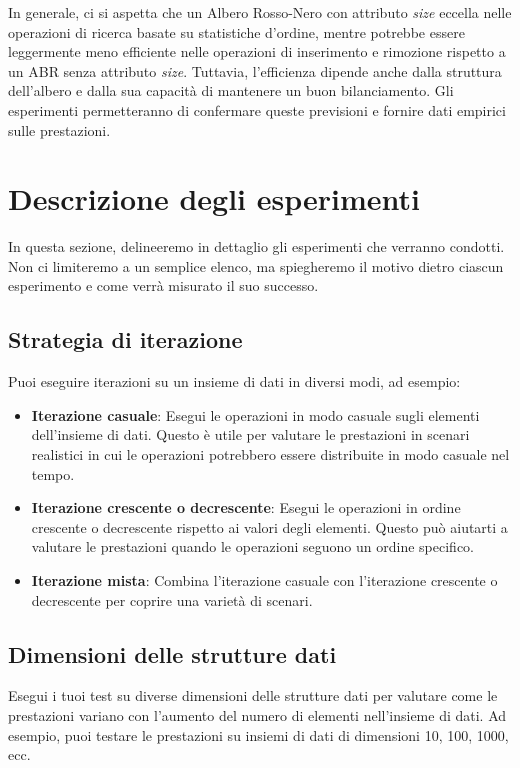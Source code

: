 \documentclass[twocolumn]{article}
\begin{document}
In generale, ci si aspetta che un Albero Rosso-Nero con attributo \textit{size} eccella nelle operazioni di ricerca basate su statistiche d'ordine, mentre potrebbe essere leggermente meno efficiente nelle operazioni di inserimento e rimozione rispetto a un ABR senza attributo \textit{size}. Tuttavia, l'efficienza dipende anche dalla struttura dell'albero e dalla sua capacità di mantenere un buon bilanciamento. Gli esperimenti permetteranno di confermare queste previsioni e fornire dati empirici sulle prestazioni.

\section{Descrizione degli esperimenti}

In questa sezione, delineeremo in dettaglio gli esperimenti che verranno condotti. Non ci limiteremo a un semplice elenco, ma spiegheremo il motivo dietro ciascun esperimento e come verrà misurato il suo successo.

\subsection{Strategia di iterazione}

Puoi eseguire iterazioni su un insieme di dati in diversi modi, ad esempio:

\begin{itemize}
  \item \textbf{Iterazione casuale}: Esegui le operazioni in modo casuale sugli elementi dell'insieme di dati. Questo è utile per valutare le prestazioni in scenari realistici in cui le operazioni potrebbero essere distribuite in modo casuale nel tempo.
  \item \textbf{Iterazione crescente o decrescente}: Esegui le operazioni in ordine crescente o decrescente rispetto ai valori degli elementi. Questo può aiutarti a valutare le prestazioni quando le operazioni seguono un ordine specifico.
  \item \textbf{Iterazione mista}: Combina l'iterazione casuale con l'iterazione crescente o decrescente per coprire una varietà di scenari.
\end{itemize}

\subsection{Dimensioni delle strutture dati}

Esegui i tuoi test su diverse dimensioni delle strutture dati per valutare come le prestazioni variano con l'aumento del numero di elementi nell'insieme di dati. Ad esempio, puoi testare le prestazioni su insiemi di dati di dimensioni 10, 100, 1000, ecc.
\end{document}
